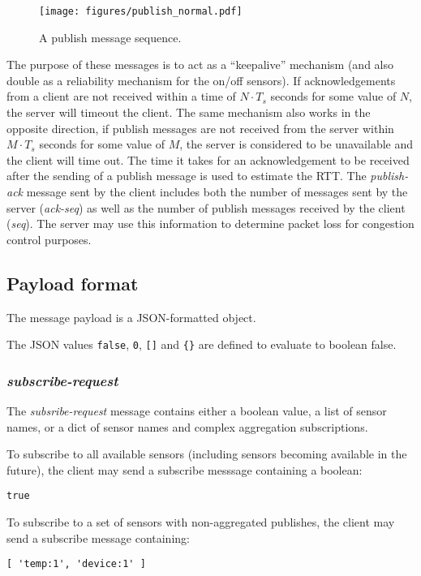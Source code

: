 \documentclass[a4paper]{article}
\begin{document}
\begin{figure}
	\centering
    \texttt{[image: figures/publish\_normal.pdf]}
    \caption{A publish message sequence.}
    \label{fig:pub_normal}
\end{figure}

The purpose of these messages is to act as a ``keepalive'' mechanism (and also double
as a reliability mechanism for the on/off sensors). If acknowledgements from a client
are not received within a time of $N \cdot T_s$ seconds for some value of $N$, the 
server will timeout the client. The same mechanism also works in the opposite 
direction, if publish messages are not received from the server within 
$M \cdot T_s$ seconds for some value of $M$,
the server is considered to be unavailable and the client will time out. The time it takes for an acknowledgement to be received after the sending of
a publish message is used to estimate the RTT.
The \emph{publish-ack} message sent by the client includes both the number of messages sent by the server (\emph{ack-seq}) as well as the number of publish messages received by the client (\emph{seq}).
The server may use this information to determine packet loss for congestion control purposes.

\subsection{Payload format}
\label{payload-format}

The message payload is a JSON-formatted object.

The JSON values \texttt{false}, \texttt{0}, \texttt{[]} and \texttt{\{\}} are defined to evaluate to boolean false.

\subsubsection{\emph{subscribe-request}}
The \emph{subsribe-request} message contains either a boolean value, a list of sensor names, or a dict of sensor names and complex aggregation subscriptions.

To subscribe to all available sensors (including sensors becoming available in the future), the client may send a subscribe messsage containing a boolean:
\begin{verbatim}
true
\end{verbatim}

To subscribe to a set of sensors with non-aggregated publishes, the client may send a subscribe message containing:
\begin{verbatim}
[ 'temp:1', 'device:1' ]
\end{verbatim}
\end{document}
